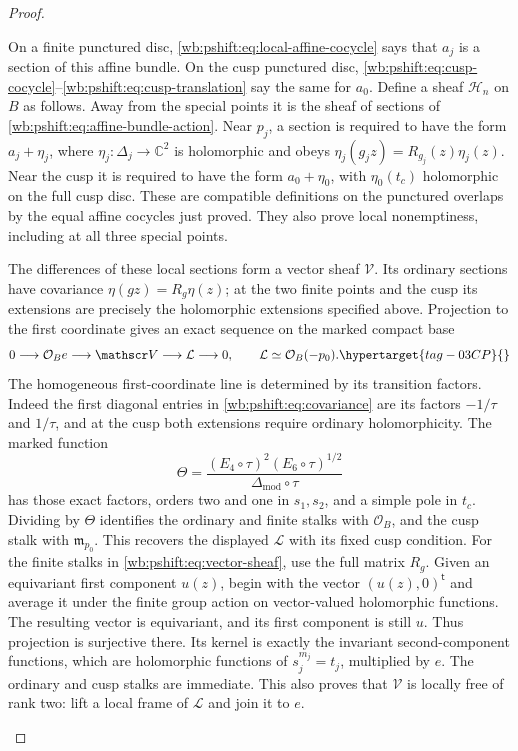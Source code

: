 \begin{proof}
\begin{enumerate}[label=\arabic*.,leftmargin=*]
On a finite punctured disc, \eqref{wb:pshift:eq:local-affine-cocycle} says that $a_j$ is a section of
this affine bundle. On the cusp punctured disc, \eqref{wb:pshift:eq:cusp-cocycle}--\eqref{wb:pshift:eq:cusp-translation} say
the same for $a_0$. Define a sheaf $\mathscr H_n$ on $B$ as follows.
Away from the special points it is the sheaf of sections of \eqref{wb:pshift:eq:affine-bundle-action}.
Near $p_j$, a section is required to have the form $a_j+\eta_j$,
where $\eta_j:\Delta_j\to\mathbb C^2$ is holomorphic and obeys
$\eta_j(g_jz)=R_{g_j}(z)\eta_j(z)$. Near the cusp it is required
to have the form $a_0+\eta_0$, with $\eta_0(t_c)$ holomorphic on
the full cusp disc. These are compatible definitions on the punctured
overlaps by the equal affine cocycles just proved. They also prove
local nonemptiness, including at all three special points.

The differences of these local sections form a vector sheaf
$\mathscr V$. Its ordinary sections have covariance $\eta(gz)=R_g\eta(z)$;
at the two finite points and the cusp its extensions are precisely
the holomorphic extensions specified above. Projection to the first
coordinate gives an exact sequence on the marked compact base
\begin{equation}
 0\longrightarrow\mathcal O_B e\longrightarrow\mathscr V
        \longrightarrow\mathcal L\longrightarrow0,
                  \qquad \mathcal L\simeq\mathcal O_B(-p_0).
 \hypertarget{tag-03CP}{}\label{wb:pshift:eq:vector-sheaf}
\end{equation}
The homogeneous first-coordinate line is determined by its transition factors. Indeed
the first diagonal entries in \eqref{wb:pshift:eq:covariance} are its factors $-1/\tau$ and
$1/\tau$, and at the cusp both extensions require ordinary
holomorphicity. The marked function
\[
 \Theta=\frac{(E_4\circ\tau)^2(E_6\circ\tau)^{1/2}}
                 {\Delta_{\mathrm{mod}}\circ\tau}
\]
has those exact factors, orders two and one in $s_1,s_2$, and a
simple pole in $t_c$. Dividing by $\Theta$ identifies the ordinary
and finite stalks with $\mathcal O_B$, and the cusp stalk with
$\mathfrak m_{p_0}$. This recovers the displayed $\mathcal L$
with its fixed cusp condition. 
For the finite stalks in \eqref{wb:pshift:eq:vector-sheaf}, use the full matrix $R_g$. Given an equivariant first component
$u(z)$, begin with the vector $(u(z),0)^{\mathsf t}$ and average it
under the finite group action on vector-valued holomorphic functions.
The resulting vector is equivariant, and its first component is
still $u$. Thus projection is surjective there. Its kernel is
exactly the invariant second-component functions, which are
holomorphic functions of $s_j^{m_j}=t_j$, multiplied by $e$.
The ordinary and cusp stalks are immediate. This also proves that
$\mathscr V$ is locally free of rank two: lift a local frame of
$\mathcal L$ and join it to $e$.


\end{enumerate}
\end{proof}

